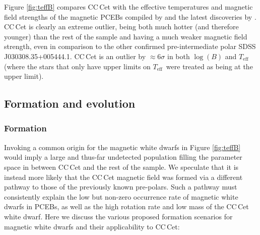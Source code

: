 \documentclass[fleqn,usenatbib]{mnras}
\newcommand{\Teff}{\mbox{$T_{\mathrm{eff}}$}}
\newcommand{\bgc}[1]{\textcolor{orange}{[#1]}}
\newcommand{\dwc}[1]{\textcolor{green}{[#1]}}
\begin{document}
Figure \ref{fig:teffB} compares CC\,Cet with the effective temperatures and magnetic field strengths of the magnetic PCEBs compiled by \citet{ferrarioetal15-1} and the latest discoveries by \citet{parsonsetal21-1}. CC\,Cet is clearly an extreme outlier, being both much hotter (and therefore younger) than the rest of the sample and having a much weaker magnetic field strength, even in comparison to the other confirmed pre-intermediate polar SDSS\,J030308.35+005444.1. CC\,Cet is an outlier by $\approx6\sigma$ in both $\log (B)$ and \Teff (where the stars that only have upper limits on \Teff\ were treated as being at the upper limit). 













\subsection{Formation and evolution}

\subsubsection{Formation}
Invoking a common origin for the magnetic white dwarfs in Figure \ref{fig:teffB} would imply a large and thus-far undetected population filling the parameter space in between CC\,Cet and the rest of the sample. We speculate that it is instead more likely that the CC\,Cet magnetic field was formed via a different pathway to those of the previously known pre-polars. Such a pathway must consistently explain the low but non-zero occurrence rate of magnetic white dwarfs in PCEBs, as well as the high rotation rate and low mass of the CC\,Cet white dwarf.
Here we discuss the various proposed formation scenarios for magnetic white dwarfs and their applicability to CC\,Cet:
\end{document}
